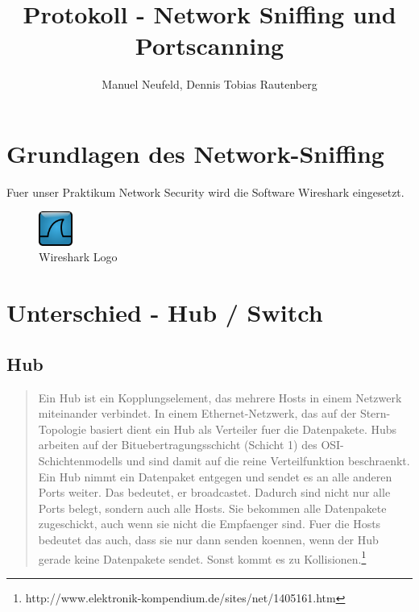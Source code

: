 \documentclass[a4paper]{report}
\title{Protokoll -  Network Sniffing und Portscanning}
\author{Manuel Neufeld, Dennis Tobias Rautenberg}
\begin{document}
\maketitle

\chapter{Grundlagen des Network-Sniffing}
Fuer unser Praktikum Network Security wird die Software Wireshark eingesetzt.

\begin{figure}[htb]
	\centering
		\includegraphics[width=0.10\textwidth]{wireshark-logo.png}
	\caption{Wireshark Logo}
	\label{fig:wiresharklogo}
\end{figure}


\chapter{Unterschied - Hub / Switch}

\section{Hub}
\begin{quote}
Ein Hub ist ein Kopplungselement, das mehrere Hosts in einem Netzwerk miteinander verbindet. In einem Ethernet-Netzwerk, das auf der Stern-Topologie basiert dient ein Hub als Verteiler fuer die Datenpakete. Hubs arbeiten auf der Bituebertragungsschicht (Schicht 1) des OSI-Schichtenmodells und sind damit auf die reine Verteilfunktion beschraenkt.
Ein Hub nimmt ein Datenpaket entgegen und sendet es an alle anderen Ports weiter. Das bedeutet, er broadcastet. Dadurch sind nicht nur alle Ports belegt, sondern auch alle Hosts. Sie bekommen alle Datenpakete zugeschickt, auch wenn sie nicht die Empfaenger sind. Fuer die Hosts bedeutet das auch, dass sie nur dann senden koennen, wenn der Hub gerade keine Datenpakete sendet. Sonst kommt es zu Kollisionen.\footnote{http://www.elektronik-kompendium.de/sites/net/1405161.htm} \end{quote}
\end{document}
